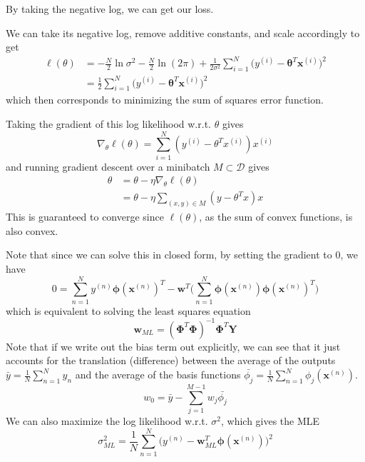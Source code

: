   By taking the negative log, we can get our loss.  

  \begin{definition}
    We can take its negative log, remove additive constants, and scale accordingly to get 
    \begin{align*}
      \ell (\theta) & = -\frac{N}{2} \ln{\sigma^2} - \frac{N}{2} \ln(2 \pi) + \frac{1}{2 \sigma^2} \sum_{i=1}^N \big(y^{(i)} - \boldsymbol{\theta}^T \mathbf{x}^{(i)} \big)^2 \\
      & =\frac{1}{2} \sum_{i=1}^N \big(y^{(i)} - \boldsymbol{\theta}^T \mathbf{x}^{(i)} \big)^2 
    \end{align*}
    which then corresponds to minimizing the sum of squares error function. 
  \end{definition}

  \begin{theorem}
    Taking the gradient of this log likelihood w.r.t. $\theta$ gives 
    \[\nabla_\theta \ell (\theta) = \sum_{i=1}^N ( y^{(i)} - \theta^T x^{(i)}) x^{(i)} \]
    and running gradient descent over a minibatch $M \subset \mathcal{D}$ gives 
    \begin{align*}
        \theta & = \theta - \eta \nabla_\theta \ell (\theta) \\
        & = \theta - \eta \sum_{(x, y) \in M} (y - \theta^T x) x
    \end{align*}
    This is guaranteed to converge since $\ell(\theta)$, as the sum of convex functions, is also convex. 

    Note that since we can solve this in closed form, by setting the gradient to $0$, we have 
    \[0 = \sum_{n=1}^N y^{(n)} \boldsymbol{\phi}(\mathbf{x}^{(n)})^T - \mathbf{w}^T \bigg( \sum_{n=1}^N \boldsymbol{\phi}(\mathbf{x}^{(n)}) \boldsymbol{\phi}(\mathbf{x}^{(n)})^T \bigg)\]
    which is equivalent to solving the least squares equation 
    \[\mathbf{w}_{ML} = ( \boldsymbol{\Phi}^T \boldsymbol{\Phi})^{-1} \boldsymbol{\Phi}^T \mathbf{Y}\]
    Note that if we write out the bias term out explicitly, we can see that it just accounts for the translation (difference) between the average of the outputs $\bar{y} = \frac{1}{N} \sum_{n=1}^N y_n$ and the average of the basis functions $\bar{\phi_j} = \frac{1}{N} \sum_{n=1}^N \phi_j (\mathbf{x}^{(n)})$. 
    \[w_0 = \bar{y} - \sum_{j=1}^{M-1} w_j \bar{\phi_j}\]
    We can also maximize the log likelihood w.r.t. $\sigma^2$, which gives the MLE 
    \[\sigma^2_{ML} = \frac{1}{N} \sum_{n=1}^N \big( y^{(n)} - \mathbf{w}^T_{ML} \boldsymbol{\phi}(\mathbf{x}^{(n)}) \big)^2\]
  \end{theorem}


